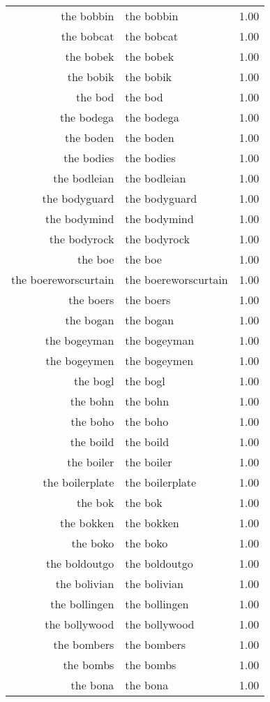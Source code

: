 \begin{table}[ht]
\begin{tabular}{rlr}
  the bobbin & the bobbin & 1.00 \\ 
  the bobcat & the bobcat & 1.00 \\ 
  the bobek & the bobek & 1.00 \\ 
  the bobik & the bobik & 1.00 \\ 
  the bod & the bod & 1.00 \\ 
  the bodega & the bodega & 1.00 \\ 
  the boden & the boden & 1.00 \\ 
  the bodies & the bodies & 1.00 \\ 
  the bodleian & the bodleian & 1.00 \\ 
  the bodyguard & the bodyguard & 1.00 \\ 
  the bodymind & the bodymind & 1.00 \\ 
  the bodyrock & the bodyrock & 1.00 \\ 
  the boe & the boe & 1.00 \\ 
  the boereworscurtain & the boereworscurtain & 1.00 \\ 
  the boers & the boers & 1.00 \\ 
  the bogan & the bogan & 1.00 \\ 
  the bogeyman & the bogeyman & 1.00 \\ 
  the bogeymen & the bogeymen & 1.00 \\ 
  the bogl & the bogl & 1.00 \\ 
  the bohn & the bohn & 1.00 \\ 
  the boho & the boho & 1.00 \\ 
  the boild & the boild & 1.00 \\ 
  the boiler & the boiler & 1.00 \\ 
  the boilerplate & the boilerplate & 1.00 \\ 
  the bok & the bok & 1.00 \\ 
  the bokken & the bokken & 1.00 \\ 
  the boko & the boko & 1.00 \\ 
  the boldoutgo & the boldoutgo & 1.00 \\ 
  the bolivian & the bolivian & 1.00 \\ 
  the bollingen & the bollingen & 1.00 \\ 
  the bollywood & the bollywood & 1.00 \\ 
  the bombers & the bombers & 1.00 \\ 
  the bombs & the bombs & 1.00 \\ 
  the bona & the bona & 1.00 \\ 

\end{tabular}
\end{table}
